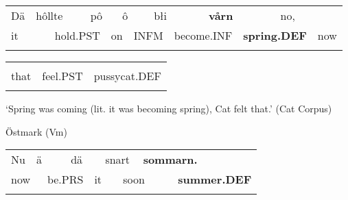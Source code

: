 \begin{tabular}{llllllllllllll}
\lsptoprule
Dä & \multicolumn{2}{l}{hôllte

} & \multicolumn{2}{l}{pô

} & \multicolumn{2}{l}{ô

} & \multicolumn{2}{l}{błi

} & \multicolumn{2}{l}{{\bfseries vårn}

} & \multicolumn{2}{l}{no,

} & \\
\multicolumn{2}{l}{it

} & \multicolumn{2}{l}{hold.PST

} & \multicolumn{2}{l}{on

} & \multicolumn{2}{l}{INFM

} & \multicolumn{2}{l}{become.INF

} & \multicolumn{2}{l}{{\bfseries spring.DEF}

} & \multicolumn{2}{l}{now

}\\
\lspbottomrule
\end{tabular}

\begin{tabular}{lll}
\lsptoprule
\multicolumn{3}{l}{dä

}\\
that & feel.PST & pussycat.DEF\\
\lspbottomrule
\end{tabular}

\begin{styleTranslation}
‘Spring was coming (lit. it was becoming spring), Cat felt that.’ (Cat Corpus)

\end{styleTranslation}

\begin{listWWNumileveli}
\item {}

\begin{styleExample}
Östmark (Vm)

\end{styleExample}

\end{listWWNumileveli}

\begin{tabular}{llllllllll}
\lsptoprule
Nu & \multicolumn{2}{l}{ä

} & \multicolumn{2}{l}{dä

} & \multicolumn{2}{l}{snart

} & \multicolumn{2}{l}{{\bfseries sommarn.}

} & \\
\multicolumn{2}{l}{now

} & \multicolumn{2}{l}{be.PRS

} & \multicolumn{2}{l}{it

} & \multicolumn{2}{l}{soon

} & \multicolumn{2}{l}{{\bfseries summer.DEF}

}\\
\lspbottomrule
\end{tabular}


